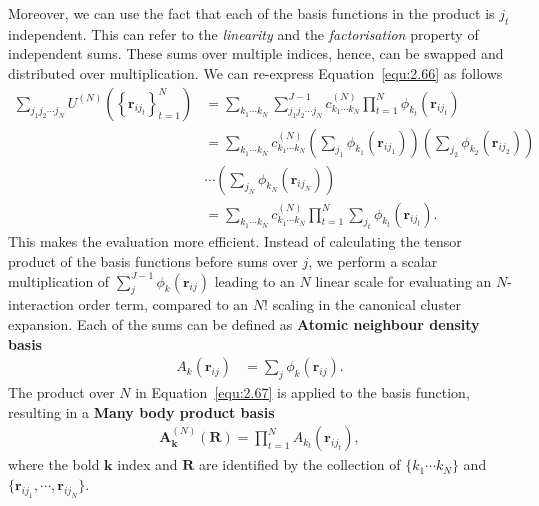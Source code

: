 Moreover, we can use the fact that each of the basis functions in the product is $j_{t}$ independent. 
This can refer to the \textit{linearity} and the \textit{factorisation} property of independent sums.
These sums over multiple indices, hence, can be swapped and distributed over multiplication.
We can re-express Equation~\eqref{equ:2.66} as follows
\begin{equation}
\label{equ:2.67}
\begin{split}
\sum_{{j}_{1}{j}_{2}\cdots{j}_{N}}U^{(N)}(\left\{\mathbf{r}_{ij_{t}}\right\}_{t=1}^{N})
&=\sum_{{k}_{1}\cdots{k}_{N}}\sum^{J-1}_{{j}_{1}{j}_{2}\cdots{j}_{N}}
c^{(N)}_{{k}_{1}\cdots{k}_{N}}\prod_{t=1}^{N}\phi_{k_{t}}(\mathbf{r}_{i{j}_{t}})\\ 
&=\sum_{{k}_{1}\cdots{k}_{N}}
c^{(N)}_{{k}_{1}\cdots{k}_{N}}
\left(
\sum_{{j}_{1}}\phi_{k_{1}}(\mathbf{r}_{i{j}_{1}})
\right)
\left(
\sum_{{j}_{2}}\phi_{k_{2}}(\mathbf{r}_{i{j}_{2}})
\right)\\ 
&
\cdots
\left(
\sum_{{j}_{N}}\phi_{k_{N}}(\mathbf{r}_{i{j}_{N}})
\right)\\ 
&=\sum_{{k}_{1}\cdots{k}_{N}}
c^{(N)}_{{k}_{1}\cdots{k}_{N}}\prod_{t=1}^{N}\sum_{{j}_{t}}\phi_{k_{t}}(\mathbf{r}_{i{j}_{t}}).
\end{split}
\end{equation}
This makes the evaluation more efficient.
Instead of calculating the tensor product of the basis functions before sums over $j$, we perform a scalar multiplication of $\sum^{J-1}_{j}\phi_{k}(\mathbf{r}_{ij})$ leading to an $N$ linear scale for evaluating an $N$-interaction order term, compared to an $N!$ scaling in the canonical cluster expansion. Each of the sums can be defined as \textbf{Atomic neighbour density basis}   
\begin{equation}
\label{equ:2.68}
\begin{split}
A_{k}(\mathbf{r}_{ij})&=\sum_{j}\phi_{k}(\mathbf{r}_{ij}).
\end{split}
\end{equation}
The product over $N$ in Equation~\eqref{equ:2.67} is applied to the basis function, resulting in a \textbf{Many body product basis} 
\begin{equation}
\label{equ:2.69}
\begin{split}
\textbf{A}^{(N)}_{\mathbf{k}}(\mathbf{R})=\prod_{t=1}^{N}A_{k_{t}}(\mathbf{r}_{ij_{t}}),
\end{split}
\end{equation}
where the bold $\textbf{k}$ index and $\mathbf{R}$ are identified by the collection of $\{{k}_{1}\cdots{k}_{N}\}$ and $\{\mathbf{r}_{ij_{1}},\cdots,\mathbf{r}_{ij_{N}}\}$.
